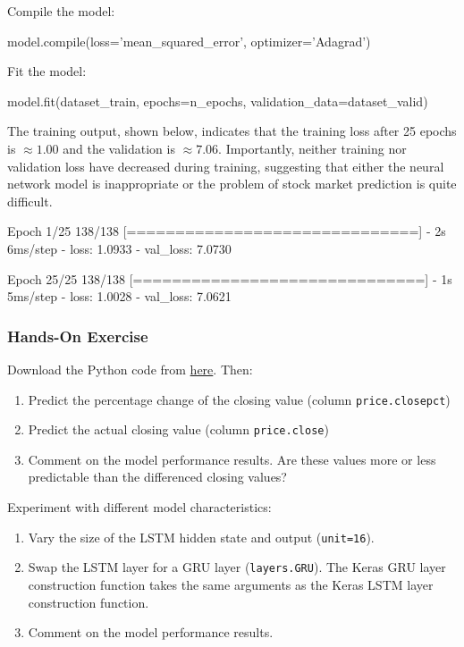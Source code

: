 Compile the model:
\begin{samepage}
\begin{pythoncode}
model.compile(loss='mean_squared_error', 
              optimizer='Adagrad')
\end{pythoncode}
\end{samepage}

\begin{samepage}
Fit the model:
\begin{pythoncode}
model.fit(dataset_train, epochs=n_epochs,
          validation_data=dataset_valid)
\end{pythoncode}
\end{samepage}

The training output, shown below, indicates that the training loss after 25 epochs is $\approx 1.00$ and the validation is $\approx 7.06$. Importantly, neither training nor validation loss have decreased during training, suggesting that either the neural network model is inappropriate or the problem of stock market prediction is quite difficult.

\begin{textcode}
Epoch 1/25
138/138 [==============================] - 2s 6ms/step -
 loss: 1.0933 - val_loss: 7.0730

Epoch 25/25
138/138 [==============================] - 1s 5ms/step -
 loss: 1.0028 - val_loss: 7.0621
\end{textcode}

\begin{tcolorbox}[colback=code]
\subsubsection*{Hands-On Exercise} 

Download the Python code from \href{https://raw.githubusercontent.com/jevermann/busi4720-ml/main/lstm_example.py}{here}. Then:

\begin{enumerate}
   \item Predict the percentage change of the closing value (column \texttt{price.closepct})
   \item Predict the actual closing value (column \texttt{price.close})
   \item Comment on the model performance results. Are these values more or less predictable than the differenced closing values?
\end{enumerate} \vspace{\baselineskip}

Experiment with different model characteristics:
\begin{enumerate}
    \item Vary the size of the LSTM hidden state and output (\texttt{unit=16}).
    \item Swap the LSTM layer for a GRU layer (\texttt{layers.GRU}). The Keras GRU layer construction function takes the same arguments as the Keras LSTM layer construction function.
    \item Comment on the model performance results.
\end{enumerate}
\end{tcolorbox}

